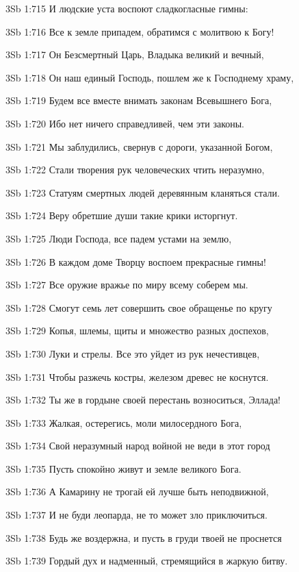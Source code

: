 \vs 3Sb 1:715 И людские уста воспоют сладкогласные гимны:

\vs 3Sb 1:716 Все к земле припадем, обратимся с молитвою к Богу! 

\vs 3Sb 1:717 Он  Безсмертный Царь, Владыка великий и вечный, 

\vs 3Sb 1:718 Он  наш единый Господь, пошлем же к Господнему храму, 

\vs 3Sb 1:719 Будем все вместе внимать законам Всевышнего Бога,

\vs 3Sb 1:720 Ибо нет ничего справедливей, чем эти законы. 

\vs 3Sb 1:721 Мы заблудились, свернув с дороги, указанной Богом, 

\vs 3Sb 1:722 Стали творения рук человеческих чтить неразумно, 

\vs 3Sb 1:723 Статуям смертных людей деревянным кланяться стали. 

\vs 3Sb 1:724 Веру обретшие души такие крики исторгнут.

\vs 3Sb 1:725 Люди Господа, все падем устами на землю,

\vs 3Sb 1:726 В каждом доме Творцу воспоем прекрасные гимны! 

\vs 3Sb 1:727 Все оружие вражье по миру всему соберем мы. 

\vs 3Sb 1:728 Смогут семь лет совершить свое обращенье по кругу 

\vs 3Sb 1:729 Копья, шлемы, щиты и множество разных доспехов,

\vs 3Sb 1:730 Луки и стрелы. Все это уйдет из рук нечестивцев, 

\vs 3Sb 1:731 Чтобы разжечь костры, железом древес не коснутся.

\vs 3Sb 1:732 Ты же в гордыне своей перестань возноситься, Эллада! 

\vs 3Sb 1:733 Жалкая, остерегись, моли милосердного Бога,

\vs 3Sb 1:734 Свой неразумный народ войной не веди в этот город  

\vs 3Sb 1:735 Пусть спокойно живут и земле великого Бога.

\vs 3Sb 1:736 А Камарину не трогай  ей лучше быть неподвижной, 

\vs 3Sb 1:737 И не буди леопарда, не то может зло приключиться. 

\vs 3Sb 1:738 Будь же воздержна, и пусть в груди твоей не проснется 

\vs 3Sb 1:739 Гордый дух и надменный, стремящийся в жаркую битву. 

